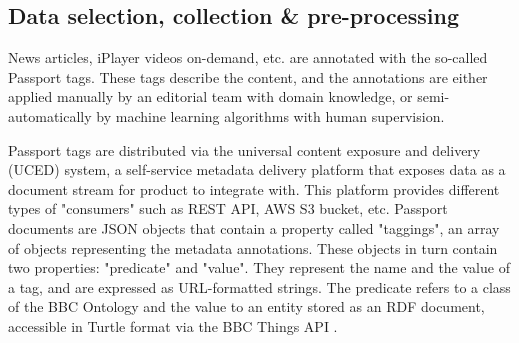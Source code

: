 
\subsection{Data selection, collection \& pre-processing}

News articles, iPlayer videos on-demand, etc. are annotated with the so-called Passport tags.
These tags describe the content, and the annotations are either applied manually
by an editorial team with domain knowledge, or semi-automatically by machine learning algorithms with human supervision.

Passport tags are distributed via the universal content exposure and delivery (UCED) system,
a self-service metadata delivery platform that exposes data as a document stream for product to integrate with.
This platform provides different types of "consumers" such as REST API, AWS S3 bucket, etc.
Passport documents are JSON objects that contain a property called "taggings", an array of objects representing the
metadata annotations. These objects in turn contain two properties: "predicate" and "value". They represent the name and the value of
a tag, and are expressed as URL-formatted strings. The predicate refers to a class of the BBC Ontology \cite{BBC:Ontologies}
and the value to an entity stored as an RDF document, accessible in Turtle format \cite{W3C:Turtle} via the BBC Things API \cite{BBC:Things,BBC:Things:About,BBC:Things:API}.


